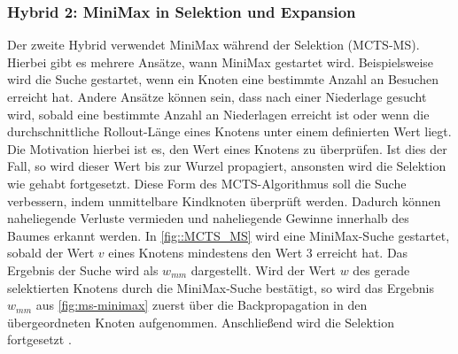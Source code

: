 \documentclass[12pt,a4paper,bibliography=totocnumbered,listof=totocnumbered]{article}
\begin{document}
\subsubsection{Hybrid 2: MiniMax in Selektion und Expansion}
Der zweite Hybrid verwendet MiniMax während der Selektion (MCTS-MS). Hierbei gibt es mehrere Ansätze, wann MiniMax gestartet wird. Beispielsweise wird die Suche gestartet, wenn ein Knoten eine bestimmte Anzahl an Besuchen erreicht hat. Andere Ansätze können sein, dass nach einer Niederlage gesucht wird, sobald eine bestimmte Anzahl an Niederlagen erreicht ist oder wenn die durchschnittliche Rollout-Länge eines Knotens unter einem definierten Wert liegt. Die Motivation hierbei ist es, den Wert eines Knotens zu überprüfen. Ist dies der Fall, so wird dieser Wert bis zur Wurzel propagiert, ansonsten wird die Selektion wie gehabt fortgesetzt. Diese Form des MCTS-Algorithmus soll die Suche verbessern, indem unmittelbare Kindknoten überprüft werden. Dadurch können naheliegende Verluste vermieden und naheliegende Gewinne innerhalb des Baumes erkannt werden.
In \autoref{fig::MCTS_MS} wird eine MiniMax-Suche gestartet, sobald der Wert $v$ eines Knotens mindestens den Wert 3 erreicht hat. Das Ergebnis der Suche wird als $w_{mm}$ dargestellt. Wird der Wert $w$ des gerade selektierten Knotens durch die MiniMax-Suche bestätigt, so wird das Ergebnis $w_{mm}$ aus \ref{fig:ms-minimax} zuerst über die Backpropagation in den übergeordneten Knoten aufgenommen. Anschließend wird die Selektion fortgesetzt \citep{Baier.2015}.
\end{document}
